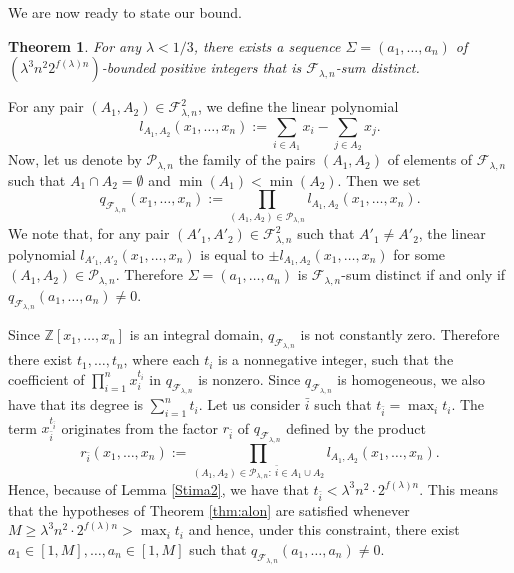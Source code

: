 \documentclass[a4paper]{amsart}
\theoremstyle{plain}
\newtheorem{Definition}{Definition}[section]
\newtheorem{Theorem}[Definition]{Theorem}
\begin{document}

We are now ready to state our bound.

\begin{Theorem}\label{NUB}
For any $\lambda<1/3$, there exists a sequence $\Sigma=(a_1,\dots,a_n)$ of $\left(\lambda^3 n^2 2^{f(\lambda) n}\right )$-bounded positive integers that is $\mathcal{F}_{\lambda,n}$-sum distinct.
\end{Theorem}
\proof
For any pair $(A_1,A_2)\in \mathcal{F}_{\lambda,n}^2$, we define the linear polynomial $$l_{A_1,A_2}(x_1,\dots,x_n):=\sum_{i\in A_1} x_i-\sum_{j\in A_2} x_j.$$
Now, let us denote by $\mathcal{P}_{\lambda,n}$ the family of the pairs $(A_1,A_2)$ of elements of $\mathcal{F}_{\lambda,n}$ such that $A_1\cap A_2=\emptyset$ and $\min(A_1)<\min(A_2)$.
Then we set
$$q_{\mathcal{F}_{\lambda,n}}(x_1,\dots,x_n):=\prod_{(A_1,A_2)\in \mathcal{P}_{\lambda,n}}l_{A_1,A_2}(x_1,\dots,x_n).$$
We note that, for any pair $(A'_1,A'_2)\in \mathcal{F}_{\lambda,n}^2$ such that $A'_1\not=A'_2$, the linear polynomial $l_{A'_1,A'_2}(x_1,\dots,x_n)$ is equal to $\pm l_{A_1,A_2}(x_1,\dots,x_n)$ for some $(A_1,A_2)\in \mathcal{P}_{\lambda,n}$.
Therefore $\Sigma=(a_1,\dots,a_n)$ is $\mathcal{F}_{\lambda,n}$-sum distinct if and only if $q_{\mathcal{F}_{\lambda,n}}(a_1,\dots,a_n)\not=0$.

Since $\mathbb{Z}[x_1,\dots,x_n]$ is an integral domain, $q_{\mathcal{F}_{\lambda,n}}$ is not constantly zero. Therefore there exist $t_1,\dots,t_n$,
where each $t_i$ is a nonnegative integer, such that the coefficient of
$\prod\limits_{i=1}^n x_i^{t_i}$ in $q_{\mathcal{F}_{\lambda,n}}$ is nonzero.
Since $q_{\mathcal{F}_{\lambda,n}}$ is homogeneous, we also have that its degree is $\sum\limits_{i=1}^n t_i$. Let us consider $\bar{i}$ such that $t_{\bar{i}}=\max_i t_i$. The term $x_{\bar{i}}^{t_{\bar{i}}}$ originates from the factor $r_{\bar{i}}$ of $q_{\mathcal{F}_{\lambda,n}}$ defined by the product
$$r_{\bar{i}}(x_1,\dots,x_n):=\prod_{(A_1,A_2)\in \mathcal{P}_{\lambda,n}:\ \bar{i}\in A_1\cup A_2}l_{A_1,A_2}(x_1,\dots,x_n).$$
Hence, because of Lemma \ref{Stima2}, we have that $t_{\bar{i}}< \lambda^3 n^2 \cdot 2^{f(\lambda)n}$. This means that the hypotheses of Theorem \ref{thm:alon} are satisfied whenever $M\geq \lambda^3 n^2 \cdot 2^{f(\lambda) n}>\max_i t_i$ and hence, under this constraint, there exist $a_1\in [1,M],\ldots,a_n \in [1,M]$ such that
$q_{\mathcal{F}_{\lambda,n}}(a_1,\ldots,a_n)\neq 0$.
\endproof
\end{document}
